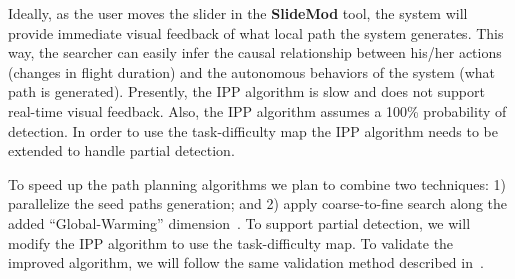 Ideally, as the user moves the slider in the \textbf{SlideMod} tool, the system will provide immediate visual feedback of what local path the system generates. This way, the searcher can easily infer the causal relationship between his/her actions (changes in flight duration) and the autonomous behaviors of the system (what path is generated). Presently, the IPP algorithm is slow and does not support real-time visual feedback. Also, the IPP algorithm assumes a 100\% probability of detection. In order to use the task-difficulty map the IPP algorithm needs to be extended to handle partial detection.

To speed up the path planning algorithms we plan to combine two techniques: 1) parallelize the seed paths generation; and 2) apply coarse-to-fine search along the added ``Global-Warming'' dimension~\cite{Lin2009UAV}. To support partial detection, we will modify the IPP algorithm to use the task-difficulty map. To validate the improved algorithm, we will follow the same validation method described in~\cite{Lin2009UAV}.

